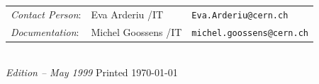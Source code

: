 
\vfill
\begin{flushleft}
\begin{tabular}{@{}l@{\quad}l@{\quad}l}
\emph{Contact Person}:& Eva Arderiu /IT    & 
                        \texttt{Eva.Arderiu@cern.ch}\\
\emph{Documentation}: & Michel Goossens /IT         & 
                        \texttt{michel.goossens@cern.ch}
\end{tabular}\\[5mm]
\emph{Edition -- May 1999} \hfill \footnotesize Printed \today
\end{flushleft}
\newpage

\setcounter{page}{1}

\tableofcontents
\endinput



